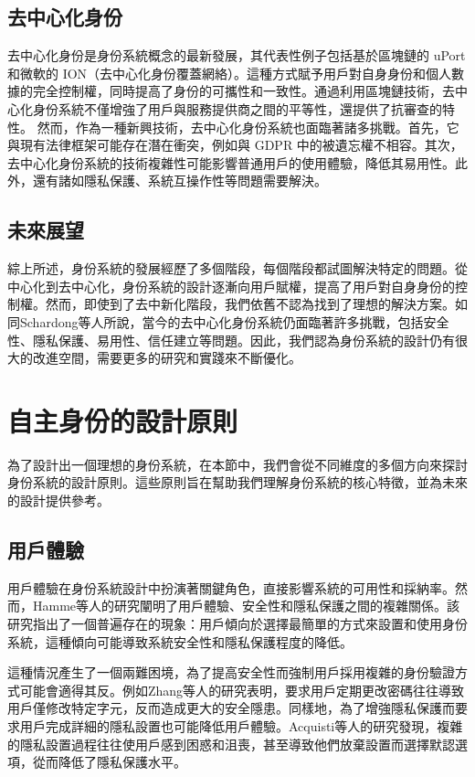 \subsection{去中心化身份}
去中心化身份是身份系統概念的最新發展\cite{preukschat2021self}，其代表性例子包括基於區塊鏈的 uPort 和微軟的 ION（去中心化身份覆蓋網絡）\cite{lundkvist2017uport, microsoft2020ion}。這種方式賦予用戶對自身身份和個人數據的完全控制權，同時提高了身份的可攜性和一致性。通過利用區塊鏈技術，去中心化身份系統不僅增強了用戶與服務提供商之間的平等性，還提供了抗審查的特性。
然而，作為一種新興技術，去中心化身份系統也面臨著諸多挑戰\cite{s22155641}。首先，它與現有法律框架可能存在潛在衝突，例如與 GDPR 中的被遺忘權不相容\cite{finck2018blockchains}。其次，去中心化身份系統的技術複雜性可能影響普通用戶的使用體驗，降低其易用性\cite{kubach2020self}。此外，還有諸如隱私保護、系統互操作性等問題需要解決。
\subsection{未來展望}
綜上所述，身份系統的發展經歷了多個階段，每個階段都試圖解決特定的問題。從中心化到去中心化，身份系統的設計逐漸向用戶賦權，提高了用戶對自身身份的控制權。然而，即使到了去中新化階段，我們依舊不認為找到了理想的解決方案。如同Schardong等人\cite{s22155641,soltani2021surveydid}所說，當今的去中心化身份系統仍面臨著許多挑戰，包括安全性、隱私保護、易用性、信任建立等問題。因此，我們認為身份系統的設計仍有很大的改進空間，需要更多的研究和實踐來不斷優化。
\section{自主身份的設計原則}
為了設計出一個理想的身份系統，在本節中，我們會從不同維度的多個方向來探討身份系統的設計原則。這些原則旨在幫助我們理解身份系統的核心特徵，並為未來的設計提供參考。
\subsection{用戶體驗}
用戶體驗在身份系統設計中扮演著關鍵角色，直接影響系統的可用性和採納率。然而，Hamme等人\cite{inproceedings}的研究闡明了用戶體驗、安全性和隱私保護之間的複雜關係。該研究指出了一個普遍存在的現象：用戶傾向於選擇最簡單的方式來設置和使用身份系統，這種傾向可能導致系統安全性和隱私保護程度的降低。

這種情況產生了一個兩難困境，為了提高安全性而強制用戶採用複雜的身份驗證方式可能會適得其反。例如Zhang等人\cite{zhang2010security}的研究表明，要求用戶定期更改密碼往往導致用戶僅修改特定字元，反而造成更大的安全隱患。同樣地，為了增強隱私保護而要求用戶完成詳細的隱私設置也可能降低用戶體驗。Acquisti等人\cite{acquisti2017nudges}的研究發現，複雜的隱私設置過程往往使用戶感到困惑和沮喪，甚至導致他們放棄設置而選擇默認選項，從而降低了隱私保護水平。

